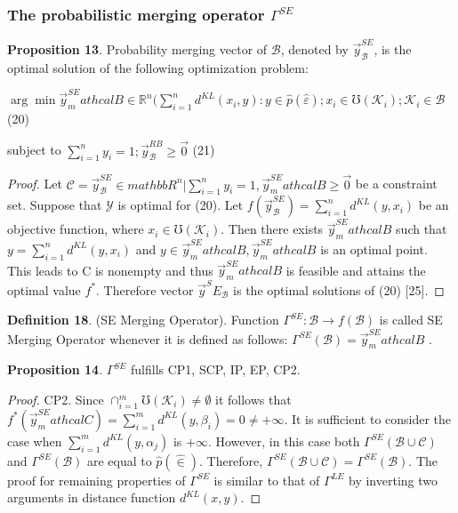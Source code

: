 \documentclass[]{iosart2c}
\begin{document}
\subsubsection{The probabilistic merging operator $\Gamma^{SE}$}

\textbf{Proposition 13}. Probability merging vector of $\mathcal{B}$,
denoted by $\vec{y}^{SE}_\mathcal{B}$, is the optimal solution of the following optimization problem:

$\arg \min\vec{y}^{SE}_mathcal{B} \in \mathbb{R}^n (
\sum^n_{i=1} d^{KL}(x_i, y) :
y \in \hat{p}(\hat{\varepsilon}); x_i \in \mho(\mathcal{K}_i);\mathcal{K}_i \in \mathcal{B}$ (20)

subject to $\sum^n_{i=1} y_i = 1; \vec{y}^{RB}_\mathcal{B}\geq\vec{0}$ (21)
\begin{proof}Let $\mathcal{C} = {\vec{y}^{SE}_\mathcal{B} \in mathbb{R}^n|\sum^n_{i=1} y_i = 1, \vec{y}^{SE}_mathcal{B}\geq\vec{0}}$ 
be a constraint set. Suppose that $\mathcal{Y}$ is optimal for  
(20). Let $f(\vec{y}^{SE}_\mathcal{B})= \sum^n_{i=1} d^{KL}(y, x_i)$ be an objective function, 
where $x_i \in \mho(\mathcal{K}_i)$. Then there exists $\vec{y}^{SE}_mathcal{B}$ 
such that $y = \sum^n_{i=1} d^{KL}(y, x_i)$ and $y \in \vec{y}^{SE}_mathcal{B} ,\vec{y}^{SE}_mathcal{B}$ is 
an optimal point. This leads to C is nonempty and 
thus $\vec{y}^{SE}_mathcal{B}$ is feasible and attains the optimal value $f^*$. 
Therefore vector $\vec{y}^SE_\mathcal{B}$ is the optimal solutions of (20) 
[25]. 
\end{proof}
\textbf{Definition 18}. (SE Merging Operator). Function 
$\Gamma^{SE} : \mathcal{B} \to f(\mathcal{B})$ is called SE Merging Operator 
whenever it is defined as follows: 
$\Gamma^{SE}(\mathcal{B}) = \vec{y}^{SE}_mathcal{B}$ . 

\textbf{Proposition 14}. 
$\Gamma^{SE}$ fulfills CP1, SCP, IP, EP, CP2. 

\begin{proof}CP2. Since $\cap^m_{i=1}\mho(\mathcal{K}_i) \neq \emptyset$ it follows that 
$f^*(\vec{y}^{SE}_mathcal{C} ) = \sum^m_{i=1} d^{KL}(y, \beta_i) = 0 \neq +\infty$. It is sufficient 
to consider the case when $\sum^m_{i=1} d^{KL}(y, \alpha_j)$ 
is $+\infty$. However, in this case both $\Gamma^{SE}(\mathcal{B} \cup \mathcal{C})$ and 
$\Gamma^{SE}(\mathcal{B})$ are equal to $\hat{p}(\hat{\in})$. Therefore, $\Gamma^{SE}(\mathcal{B} \cup \mathcal{C}) = 
\Gamma^{SE}(\mathcal{B})$. The proof for remaining properties of $\Gamma^{SE}$ 
is similar to that of $\Gamma^{LE}$ by inverting two arguments 
in distance function $d^{KL}(x, y)$.
\end{proof}
\end{document}

